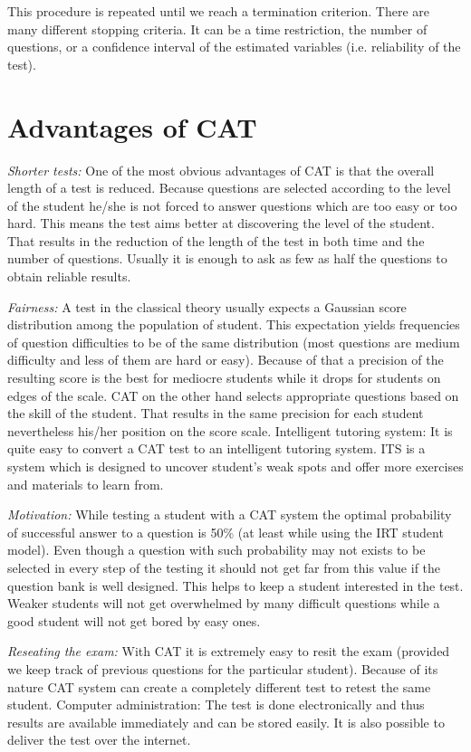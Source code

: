 This procedure is repeated until we reach a termination criterion. There are many different stopping criteria. It can be a time restriction, the number of questions, or a confidence interval of the estimated variables (i.e. reliability of the test).

\section{Advantages of CAT}
\emph{Shorter tests:} One of the most obvious advantages of CAT is that the overall length of a test is reduced. Because questions are selected according to the level of the student he/she is not forced to answer questions which are too easy or too hard. This means the test aims better at discovering the level of the student. That results in the reduction of the length of the test in both time and the number of questions. Usually it is enough to ask as few as half the questions to obtain reliable results. 

\emph{Fairness:} A test in the classical theory usually expects a Gaussian score distribution among the population of student. This expectation yields frequencies of question difficulties to be of the same distribution (most questions are medium difficulty and less of them are hard or easy). Because of that a precision of the resulting score is the best for mediocre students while it drops for students on edges of the scale. CAT on the other hand selects appropriate questions based on the skill of the student. That results in the same precision for each student nevertheless his/her position on the score scale.
Intelligent tutoring system: It is quite easy to convert a CAT test to an intelligent tutoring system. ITS is a system which is designed to uncover student’s weak spots and offer more exercises and materials to learn from.

\emph{Motivation: }While testing a student with a CAT system the optimal probability of successful answer to a question is 50\% (at least while using the IRT student model). Even though a question with such probability may not exists to be selected in every step of the testing it should not get far from this value if the question bank is well designed. This helps to keep a student interested in the test. Weaker students will not get overwhelmed by many difficult questions while a good student will not get bored by easy ones.

\emph{Reseating the exam: }With CAT it is extremely easy to resit the exam (provided we keep track of previous questions for the particular student). Because of its nature CAT system can create a completely different test to retest the same student.
Computer administration: The test is done electronically and thus results are available immediately and can be stored easily. It is also possible to deliver the test over the internet.

